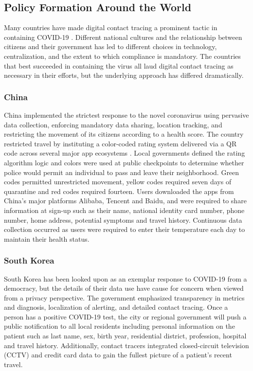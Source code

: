 \documentclass{article}
\begin{document}
\subsection{Policy Formation Around the World}

Many countries have made digital contact tracing a prominent tactic in containing COVID-19 \cite{ContactTracingWorld}. Different national cultures and the relationship between citizens and their government has led to different choices in technology, centralization, and the extent to which compliance is mandatory. The countries that best succeeded in containing the virus all laud digital contact tracing as necessary in their efforts, but the underlying approach has differed dramatically. 

\subsubsection{China}
China implemented the strictest response to the novel coronavirus using pervasive data collection, enforcing mandatory data sharing, location tracking, and restricting the movement of its citizens according to a health score. The country restricted travel by instituting a color-coded rating system delivered via a QR code across several major app ecosystems \cite{ChinaColorCodes}. Local governments defined the rating algorithm logic and colors were used at public checkpoints to determine whether police would permit an individual to pass and leave their neighborhood. Green codes permitted unrestricted movement, yellow codes required seven days of quarantine and red codes required fourteen. Users downloaded the apps from China’s major platforms Alibaba, Tencent and Baidu, and were required to share information at sign-up such as their name, national identity card number, phone number, home address, potential symptoms and travel history. Continuous data collection occurred as users were required to enter their temperature each day to maintain their health status.

\subsubsection{South Korea}
South Korea has been looked upon as an exemplar response to COVID-19 from a democracy, but the details of their data use have cause for concern when viewed from a privacy perspective. The government emphasized transparency in metrics and diagnosis, localization of alerting, and detailed contact tracing. Once a person has a positive COVID-19 test, the city or regional government will push a public notification to all local residents including personal information on the patient such as last name, sex, birth year, residential district, profession, hospital and travel history. Additionally, contact tracers integrated closed-circuit television (CCTV) and credit card data to gain the fullest picture of a patient’s recent travel. \cite{KoreaPersonalData}
\end{document}

